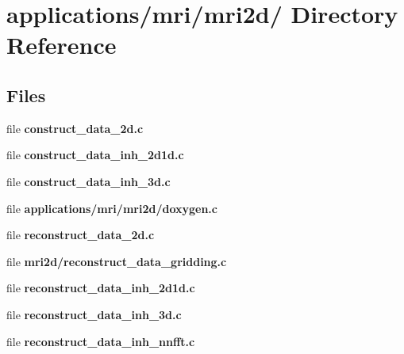\hypertarget{dir_000008}{
\section{applications/mri/mri2d/ Directory Reference}
\label{dir_000008}
}
\subsection*{Files}
\begin{CompactItemize}
\item 
file {\bf construct\_\-data\_\-2d.c}
\item 
file {\bf construct\_\-data\_\-inh\_\-2d1d.c}
\item 
file {\bf construct\_\-data\_\-inh\_\-3d.c}
\item 
file {\bf applications/mri/mri2d/doxygen.c}
\item 
file {\bf reconstruct\_\-data\_\-2d.c}
\item 
file {\bf mri2d/reconstruct\_\-data\_\-gridding.c}
\item 
file {\bf reconstruct\_\-data\_\-inh\_\-2d1d.c}
\item 
file {\bf reconstruct\_\-data\_\-inh\_\-3d.c}
\item 
file {\bf reconstruct\_\-data\_\-inh\_\-nnfft.c}
\end{CompactItemize}
